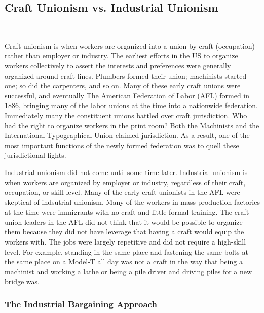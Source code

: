 
\subsection{Craft Unionism vs. Industrial Unionism} \

Craft unionism is when workers are organized into a union by craft (occupation) rather than employer or industry. The earliest efforts in the US to organize workers collectively to assert the interests and preferences were generally organized around craft lines. Plumbers formed their union; machinists started one; so did the carpenters, and so on. Many of these early craft unions were successful, and eventually The American Federation of Labor (AFL) formed in 1886, bringing many of the labor unions at the time into a nationwide federation. Immediately many the constituent unions battled over craft jurisdiction. Who had the right to organize workers in the print room? Both the Machinists and the International Typographical Union claimed jurisdiction. As a result, one of the most important functions of the newly formed federation was to quell these jurisdictional fights.

Industrial unionism did not come until some time later. Industrial unionism is when workers are organized by employer or industry, regardless of their craft, occupation, or skill level. Many of the early craft unionists in the AFL were skeptical of indsutrial unionism. Many of the workers in mass production factories at the time were immigrants with no craft and little formal training. The craft union leaders in the AFL did not think that it would be possible to organize them because they did not have leverage that having a craft would equip the workers with. The jobs were largely repetitive and did not require a high-skill level. For example, standing in the same place and fastening the same bolts at the same place on a Model-T all day was not a craft in the way that being a machinist and working a lathe or being a pile driver and driving piles for a new bridge was.

\subsubsection{The Industrial Bargaining Approach}


